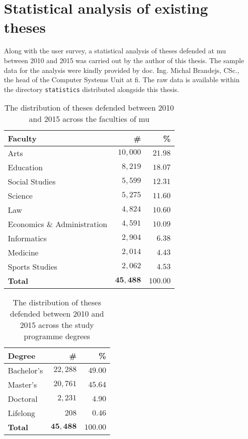 \section{Statistical analysis of existing theses}
Along with the user survey, a statistical analysis of theses defended at \gls{mu} between 2010 and 2015 was carried out by the author of this thesis. The sample data for the analysis were kindly provided by doc. Ing. Michal Brandejs, CSc., the head of the Computer Systems Unit at \gls{fi}. The raw data is available within the directory \texttt{statistics} distributed alongside this thesis.

\begin{table}
  \caption{The distribution of theses defended between 2010 and 2015 across the faculties of \acrshort{mu}}
  \begin{tabularx}{\textwidth}{Xrr}
    \textbf{Faculty} & \textbf{\#} & \textbf{\%} \\
    \hline
    Arts                         & $10{,}000$ & $21.98$ \\%
    Education                    & $8{,}219$  & $18.07$ \\%
    Social Studies               & $5{,}599$  & $12.31$ \\%
    Science                      & $5{,}275$  & $11.60$ \\%
    Law                          & $4{,}824$  & $10.60$ \\%
    Economics \& Administration  & $4{,}591$  & $10.09$ \\%
    Informatics                  & $2{,}904$  &  $6.38$ \\%
    Medicine                     & $2{,}014$  &  $4.43$ \\%
    Sports Studies               & $2{,}062$  &  $4.53$ \\%
    \hline
    \textbf{Total}               & $\mathbf{45{,}488}$ & $\mathbf{100.00}$
  \end{tabularx}
  \label{table:statistics-faculty}
\end{table}

\begin{table}
  \caption{The distribution of theses defended between 2010 and 2015 across the study programme degrees}
  \begin{tabularx}{\textwidth}{Xrr}
    \textbf{Degree} & \textbf{\#} & \textbf{\%} \\
    \hline
    Bachelor's & $22{,}288$ & $49.00$ \\
    Master's   & $20{,}761$ & $45.64$ \\
    Doctoral   &  $2{,}231$ &  $4.90$ \\
    Lifelong   &      $208$ &  $0.46$ \\
    \hline
    \textbf{Total} & $\mathbf{45{,}488}$ & $\mathbf{100.00}$
  \end{tabularx}
  \label{table:statistics-degree}
\end{table}

